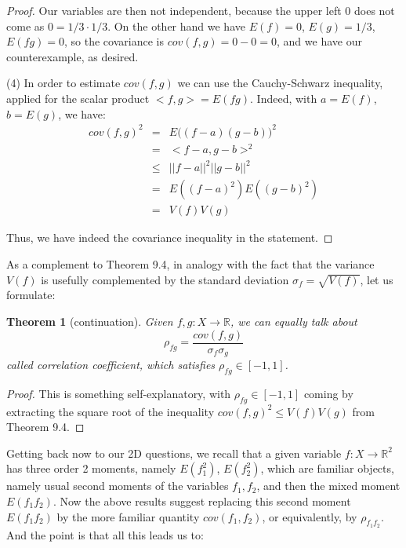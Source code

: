 \documentclass[12pt]{amsbook}
\newtheorem{theorem}{Theorem}[chapter]
\begin{document}
\begin{proof}
Our variables are then not independent, because the upper left 0 does not come as $0=1/3\cdot1/3$. On the other hand we have $E(f)=0$, $E(g)=1/3$, $E(fg)=0$, so the covariance is $cov(f,g)=0-0=0$, and we have our counterexample, as desired.

\medskip

(4) In order to estimate $cov(f,g)$ we can use the Cauchy-Schwarz inequality, applied for the scalar product $<f,g>=E(fg)$. Indeed, with $a=E(f)$, $b=E(g)$, we have:
\begin{eqnarray*}
cov(f,g)^2
&=&E\big((f-a)(g-b)\big)^2\\
&=&<f-a,g-b>^2\\
&\leq&||f-a||^2||g-b||^2\\
&=&E((f-a)^2)E((g-b)^2)\\
&=&V(f)V(g)
\end{eqnarray*}

Thus, we have indeed the covariance inequality in the statement.
\end{proof}

As a complement to Theorem 9.4, in analogy with the fact that the variance $V(f)$ is usefully complemented by the standard deviation $\sigma_f=\sqrt{V(f)}$, let us formulate:


\begin{theorem}[continuation]
Given $f,g:X\to\mathbb R$, we can equally talk about
$$\rho_{fg}=\frac{cov(f,g)}{\sigma_f\sigma_g}$$
called correlation coefficient, which satisfies $\rho_{fg}\in[-1,1]$.
\end{theorem}

\begin{proof}
This is something self-explanatory, with $\rho_{fg}\in[-1,1]$ coming by extracting the square root of the inequality $cov(f,g)^2\leq V(f)V(g)$ from Theorem 9.4.
\end{proof}

Getting back now to our 2D questions, we recall that a given variable $f:X\to\mathbb R^2$ has three order 2 moments, namely $E(f_1^2)$, $E(f_2^2)$, which are familiar objects, namely usual second moments of the variables $f_1,f_2$, and then the mixed moment $E(f_1f_2)$. Now the above results suggest replacing this second moment $E(f_1f_2)$ by the more familiar quantity $cov(f_1,f_2)$, or equivalently, by $\rho_{f_1f_2}$. And the point is that all this leads us to:

\end{document}
